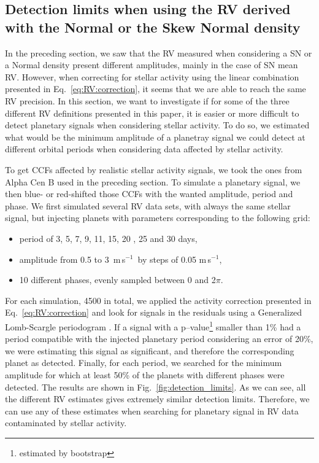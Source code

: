 \documentclass{aa}
\def\ms{\hbox{\,m\,s$^{-1}$}}         %
\begin{document}
\subsection{Detection limits when using the RV derived with the Normal or the Skew Normal density} \label{sec:detect_limits}

In the preceding section, we saw that the RV measured when considering a SN or a Normal density present different amplitudes, mainly in the case of SN mean RV. However, when correcting for stellar activity using the linear combination presented in Eq.~\ref{eq:RV:correction}, it seems that we are able to reach the same RV precision. In this section, we want to investigate if for some of the three different RV definitions presented in this paper, it is easier or more difficult to detect planetary signals when considering stellar activity. To do so, we estimated what would be the minimum amplitude of a planetray signal we could detect at different orbital periods when considering data affected by stellar activity.

To get CCFs affected by realistic stellar activity signals, we took the ones from Alpha Cen B used in the preceding section. To simulate a planetary signal, we then blue- or red-shifted those CCFs with the wanted amplitude, period and phase.
We first simulated several RV data sets, with always the same stellar signal, but injecting planets with parameters corresponding to the following grid:
\begin{itemize}
\item period of 3, 5, 7, 9, 11, 15, 20 , 25 and 30 days,
\item amplitude from 0.5 to 3 \ms\, by steps of 0.05\,\ms,
\item 10 different phases, evenly sampled between 0 and 2$\pi$.
\end{itemize}

For each simulation, 4500 in total, we applied the activity correction presented in Eq.~\ref{eq:RV:correction} and look for signals in the residuals using a Generalized Lomb-Scargle periodogram \citep[][]{Zechmeister-2009,Scargle-1982,Lomb-1976a}. If a signal with a p--value\footnote{estimated by bootstrap} smaller than 1\% had a period compatible with the injected planetary period considering an error of 20\%, we were estimating this signal as significant, and therefore the corresponding planet as detected. Finally, for each period, we searched for the minimum amplitude for which at least 50\% of the planets with different phases were detected. The results are shown in Fig.~\ref{fig:detection_limits}. As we can see, all the different RV estimates gives extremely similar detection limits. Therefore, we can use any of these estimates when searching for planetary signal in RV data contaminated by stellar activity.
\end{document}
